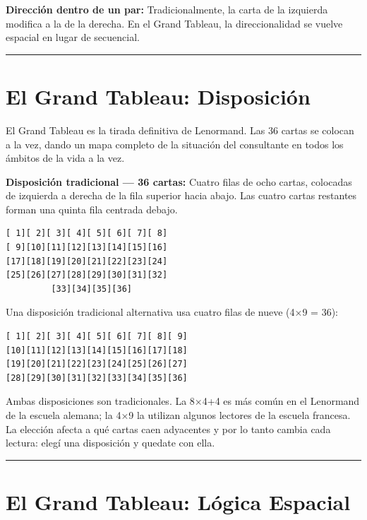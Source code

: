 \textbf{Dirección dentro de un par:} Tradicionalmente, la carta de la izquierda modifica a la de la derecha. En el Grand Tableau, la direccionalidad se vuelve espacial en lugar de secuencial.

\begin{center}\rule{0.5\linewidth}{0.5pt}\end{center}

\section{El Grand Tableau: Disposición}\label{the-grand-tableau-layout}

El Grand Tableau es la tirada definitiva de Lenormand. Las 36 cartas se colocan a la vez, dando un mapa completo de la situación del consultante en todos los ámbitos de la vida a la vez.

\textbf{Disposición tradicional --- 36 cartas:} Cuatro filas de ocho cartas, colocadas de izquierda a derecha de la fila superior hacia abajo. Las cuatro cartas restantes forman una quinta fila centrada debajo.

\begin{verbatim}
[ 1][ 2][ 3][ 4][ 5][ 6][ 7][ 8]
[ 9][10][11][12][13][14][15][16]
[17][18][19][20][21][22][23][24]
[25][26][27][28][29][30][31][32]
         [33][34][35][36]
\end{verbatim}

Una disposición tradicional alternativa usa cuatro filas de nueve (4×9 = 36):

\begin{verbatim}
[ 1][ 2][ 3][ 4][ 5][ 6][ 7][ 8][ 9]
[10][11][12][13][14][15][16][17][18]
[19][20][21][22][23][24][25][26][27]
[28][29][30][31][32][33][34][35][36]
\end{verbatim}

Ambas disposiciones son tradicionales. La 8×4+4 es más común en el Lenormand de la escuela alemana; la 4×9 la utilizan algunos lectores de la escuela francesa. La elección afecta a qué cartas caen adyacentes y por lo tanto cambia cada lectura: elegí una disposición y quedate con ella.

\begin{center}\rule{0.5\linewidth}{0.5pt}\end{center}

\section{El Grand Tableau: Lógica Espacial}\label{the-grand-tableau-spatial-logic}

